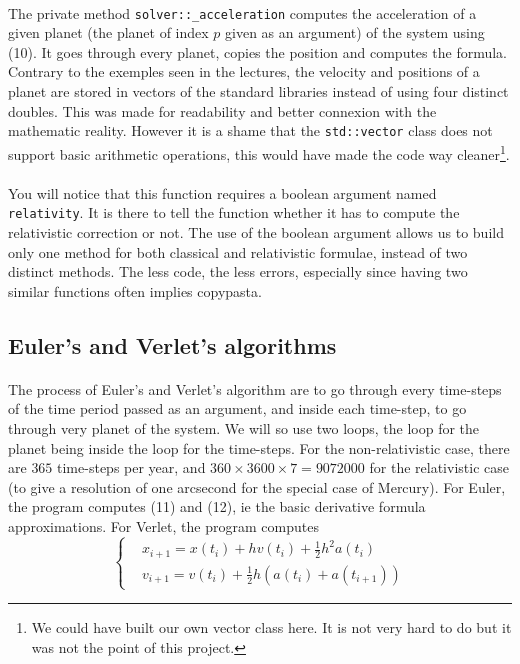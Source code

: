 \documentclass[a4paper, twoside, 11pt]{report}
\theoremstyle{theorem}
\theoremstyle{remark}
\theoremstyle{exemple}
\begin{document}
				\paragraph{}The private method \texttt{solver::\_acceleration} computes the acceleration of a given planet (the planet of index $p$ given as an argument) of the system using (10). It goes through every planet, copies the position and computes the formula. Contrary to the exemples seen in the lectures, the velocity and positions of a planet are stored in vectors of the standard libraries instead of using four distinct doubles. This was made for readability and better connexion with the mathematic reality. However it is a shame that the \texttt{std::vector} class does not support basic arithmetic operations, this would have made the code way cleaner\footnote{We could have built our own vector class here. It is not very hard to do but it was not the point of this project.}.
				
				\paragraph{}You will notice that this function requires a boolean argument named \texttt{relativity}. It is there to tell the function whether it has to compute the relativistic correction or not. The use of the boolean argument allows us to build only one method for both classical and relativistic formulae, instead of two distinct methods. The less code, the less errors, especially since having two similar functions often implies copypasta.
				
			\subsection{Euler's and Verlet's algorithms}
			
				\paragraph{}The process of Euler's and Verlet's algorithm are to go through every time-steps of the time period passed as an argument, and inside each time-step, to go through very planet of the system. We will so use two loops, the loop for the planet being inside the loop for the time-steps. For the non-relativistic case, there are $365$ time-steps per year, and $360\times3600\times7=9072000$ for the relativistic case (to give a resolution of one arcsecond for the special case of Mercury). For Euler, the program computes (11) and (12), ie the basic derivative formula approximations. For Verlet, the program computes 
				\begin{equation*}
                    \left\{
                        \begin{aligned}
                            &x_{i+1} = x(t_i) + hv(t_i) + \frac{1}{2}h^2 a(t_i) \\
                            &v_{i+1} = v(t_i) + \frac{1}{2}h\left(a(t_i) + a(t_{i+1})\right)
                        \end{aligned}
                    \right.
                \end{equation*}
                
\end{document}
